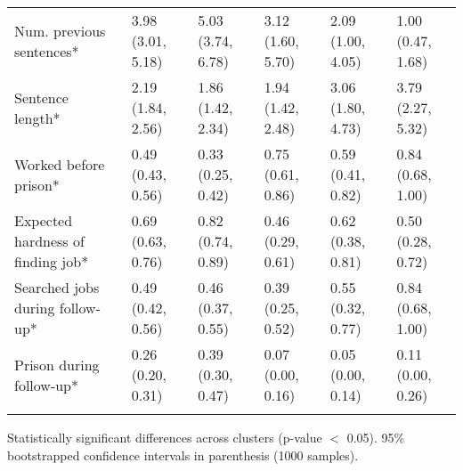 \begin{table}[htp]
\begin{threeparttable}
\begin{tabular}{llllll}
  \quad Num. previous sentences* & 3.98 (3.01, 5.18) & 5.03 (3.74, 6.78) & 3.12 (1.60, 5.70) & 2.09 (1.00, 4.05) & 1.00 (0.47, 1.68) \\ 
  \quad Sentence length* & 2.19 (1.84, 2.56) & 1.86 (1.42, 2.34) & 1.94 (1.42, 2.48) & 3.06 (1.80, 4.73) & 3.79 (2.27, 5.32) \\ 
  \quad Worked before prison* & 0.49 (0.43, 0.56) & 0.33 (0.25, 0.42) & 0.75 (0.61, 0.86) & 0.59 (0.41, 0.82) & 0.84 (0.68, 1.00) \\ 
  \quad Expected hardness of finding job* & 0.69 (0.63, 0.76) & 0.82 (0.74, 0.89) & 0.46 (0.29, 0.61) & 0.62 (0.38, 0.81) & 0.50 (0.28, 0.72) \\ 
  \quad Searched jobs during follow-up* & 0.49 (0.42, 0.56) & 0.46 (0.37, 0.55) & 0.39 (0.25, 0.52) & 0.55 (0.32, 0.77) & 0.84 (0.68, 1.00) \\ 
  \quad Prison during follow-up* & 0.26 (0.20, 0.31) & 0.39 (0.30, 0.47) & 0.07 (0.00, 0.16) & 0.05 (0.00, 0.14) & 0.11 (0.00, 0.26) \\ 
  \addlinespace
\addlinespace
\addlinespace
\hline
\addlinespace
\end{tabular}
\begin{tablenotes}
\scriptsize
    \item * Statistically significant differences across clusters (p-value $<$ 0.05). 95\% bootstrapped confidence intervals in parenthesis (1000 samples).
\end{tablenotes}
\end{threeparttable}
\end{table}
